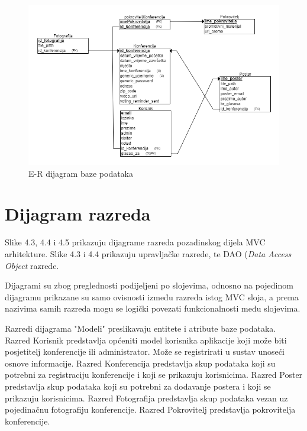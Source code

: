 					\begin{figure} [h]
						\includegraphics[width=\linewidth]{Slike/ERDijagram}
						\caption{E-R dijagram baze podataka}
					\end{figure}
			
			\eject
			
			
		\section{Dijagram razreda}
			
			\indent Slike 4.3, 4.4 i 4.5 prikazuju dijagrame razreda pozadinskog dijela MVC arhitekture. Slike 4.3 i 4.4 prikazuju upravljačke razrede, te DAO (\textit{Data Access Object} razrede. 
			
			Dijagrami su zbog preglednosti podijeljeni po slojevima, odnosno na pojedinom dijagramu prikazane su samo ovisnosti između razreda istog MVC sloja, a prema nazivima samih razreda mogu se logički povezati funkcionalnosti među slojevima.
			
			Razredi dijagrama "Modeli" preslikavaju entitete i atribute baze podataka. Razred Korisnik predstavlja općeniti model korisnika aplikacije koji može biti posjetitelj konferencije ili administrator. Može se registrirati u sustav unoseći osnove informacije. Razred Konferencija predstavlja skup podataka koji su potrebni za registraciju konferencije i koji se prikazuju korisnicima. Razred Poster predstavlja skup podataka koji su potrebni za dodavanje postera i koji se prikazuju korisnicima. Razred Fotografija predstavlja skup podataka vezan uz pojedinačnu fotografiju konferencije. Razred Pokrovitelj predstavlja pokrovitelja konferencije.
			
